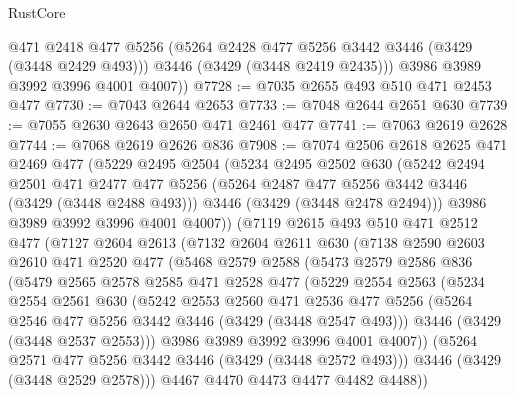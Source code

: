 \begin{lexlean}{RustCore}
\begin{coremodule}
          @471
          @2418
          @477
          @5256
          (@5264 @2428 @477 @5256 @3442 @3446 (@3429 (@3448 @2429 @493)))
          @3446
          (@3429 (@3448 @2419 @2435)))
        @3986
        @3989
        @3992
        @3996
        @4001
        @4007))
@7728 := @7035 @2655 @493 @510 @471 @2453 @477
@7730 := @7043 @2644 @2653
@7733 := @7048 @2644 @2651 @630
@7739 := @7055 @2630 @2643 @2650 @471 @2461 @477
@7741 := @7063 @2619 @2628
@7744 := @7068 @2619 @2626 @836
@7908 := @7074
    @2506
    @2618
    @2625
    @471
    @2469
    @477
    (@5229
      @2495
      @2504
      (@5234
        @2495
        @2502
        @630
        (@5242
          @2494
          @2501
          @471
          @2477
          @477
          @5256
          (@5264 @2487 @477 @5256 @3442 @3446 (@3429 (@3448 @2488 @493)))
          @3446
          (@3429 (@3448 @2478 @2494)))
        @3986
        @3989
        @3992
        @3996
        @4001
        @4007))
    (@7119
      @2615
      @493
      @510
      @471
      @2512
      @477
      (@7127
        @2604
        @2613
        (@7132
          @2604
          @2611
          @630
          (@7138
            @2590
            @2603
            @2610
            @471
            @2520
            @477
            (@5468
              @2579
              @2588
              (@5473
                @2579
                @2586
                @836
                (@5479
                  @2565
                  @2578
                  @2585
                  @471
                  @2528
                  @477
                  (@5229
                    @2554
                    @2563
                    (@5234
                      @2554
                      @2561
                      @630
                      (@5242
                        @2553
                        @2560
                        @471
                        @2536
                        @477
                        @5256
                        (@5264 @2546 @477 @5256 @3442 @3446 (@3429 (@3448 @2547 @493)))
                        @3446
                        (@3429 (@3448 @2537 @2553)))
                      @3986
                      @3989
                      @3992
                      @3996
                      @4001
                      @4007))
                  (@5264 @2571 @477 @5256 @3442 @3446 (@3429 (@3448 @2572 @493)))
                  @3446
                  (@3429 (@3448 @2529 @2578)))
                @4467
                @4470
                @4473
                @4477
                @4482
                @4488))

\end{coremodule}
\end{lexlean}
